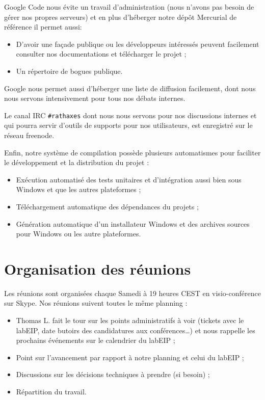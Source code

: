 \documentclass[francais]{rtxreport}
\begin{document}
Google Code nous évite un travail d'administration (nous n'avons pas besoin de
gérer nos propres serveurs) et en plus d'héberger notre dépôt Mercurial de
référence il permet aussi:
\begin{itemize}
\item D'avoir une façade publique ou les développeurs intéressés peuvent
  facilement consulter nos documentations et télécharger le projet ;
\item Un répertoire de bogues publique.
\end{itemize}
Google nous permet aussi d'héberger une liste de diffusion facilement, dont nous
nous servons intensivement pour tous nos débats internes.

Le canal IRC \texttt{\#rathaxes} dont nous nous servons pour nos discussions
internes et qui pourra servir d'outils de supports pour nos utilisateurs, est
enregistré sur le réseau freenode.

Enfin, notre système de compilation possède plusieurs automatismes pour
faciliter le développement et la distribution du projet :
\begin{itemize}
\item Exécution automatisé des tests unitaires et d'intégration aussi bien sous
  Windows et que les autres plateformes ;
\item Téléchargement automatique des dépendances du projets ;
\item Génération automatique d'un installateur Windows et des archives sources
  pour Windows ou les autre plateformes.
\end{itemize}

\section{Organisation des réunions}

Les réunions sont organisées chaque Samedi à 19 heures CEST en visio-conférence
sur Skype. Nos réunions suivent toutes le même planning :
\begin{itemize}
\item Thomas L. fait le tour sur les points administratifs à voir (tickets avec
  le labEIP, date butoirs des candidatures aux conférences\ldots) et nous
  rappelle les prochains événements sur le calendrier du labEIP ;
\item Point sur l'avancement par rapport à notre planning et celui du labEIP ;
\item Discussions sur les décisions techniques à prendre (si besoin) ;
\item Répartition du travail.
\end{itemize}
\end{document}
